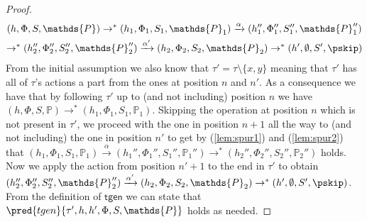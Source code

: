 \begin{proof}
\begin{gather}
	\label{lem:spur1} (h, \Phi, S, \mathds{P}) \rightarrow^* (h_1, \Phi_1, S_1, \mathds{P}_1) \xrightarrow{\alpha} (h_1'', \Phi_1'', S_1'', \mathds{P}_1'')
		\\
	\label{lem:spur2} \rightarrow^* (h_2'', \Phi_2'', S_2'',\mathds{P}_2'') \xrightarrow{\alpha'} (h_2, \Phi_2, S_2, \mathds{P}_2) \rightarrow^* (h', \emptyset, S', \pskip)
\end{gather}
From the initial assumption we also know that $\tau' = \tau \setminus \{ x, y \}$ meaning that $\tau'$ has all of $\tau$'s actions a part from the ones at position $n$ and $n'$. As a consequence we have that by following $\tau'$ up to (and not including) position $n$ we have $(h, \Phi, S, \mathds{P}) \rightarrow^* (h_1, \Phi_1, S_1, \mathds{P}_1)$. Skipping the operation at position $n$ which is not present in $\tau'$, we proceed with the one in position $n + 1$ all the way to (and not including) the one in position $n'$ to get by (\ref{lem:spur1}) and (\ref{lem:spur2}) that $(h_1, \Phi_1, S_1, \mathds{P}_1) \xrightarrow{\alpha} (h_1'', \Phi_1'', S_1'', \mathds{P}_1'') \rightarrow^* (h_2'', \Phi_2'', S_2'',\mathds{P}_2'')$ holds. Now we apply the action from position $n' + 1$ to the end in $\tau'$ to obtain $(h_2'', \Phi_2'', S_2'',\mathds{P}_2'') \xrightarrow{\alpha'} (h_2, \Phi_2, S_2, \mathds{P}_2) \rightarrow^* (h', \emptyset, S', \pskip)$. From the definition of $\mathsf{tgen}$ we can state that $\pred{tgen}{\tau', h, h', \Phi, S, \mathds{P}}$ holds as needed.
\end{proof}

